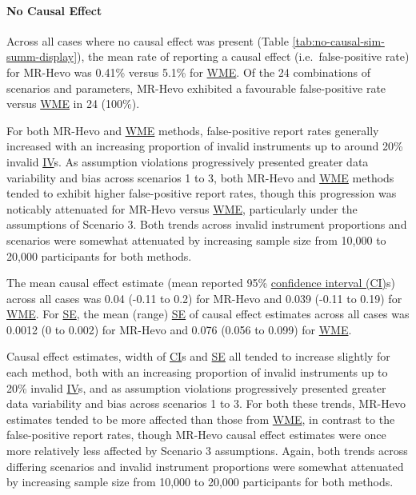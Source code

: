 \documentclass[
]{article}
\begin{document}
\paragraph{No Causal Effect}\label{no-causal-effect}

\leavevmode\newline Across all cases where no causal effect was present (Table \ref{tab:no-causal-sim-summ-display}), the mean rate of reporting a causal effect (i.e.~false-positive rate) for MR-Hevo was 0.41\% versus 5.1\% for \hyperref[acronyms_WME]{WME}. Of the 24 combinations of scenarios and parameters, MR-Hevo exhibited a favourable false-positive rate versus \hyperref[acronyms_WME]{WME} in 24 (100\%).

For both MR-Hevo and \hyperref[acronyms_WME]{WME} methods, false-positive report rates generally increased with an increasing proportion of invalid instruments up to around 20\% invalid \hyperref[acronyms_IV]{IV}s. As assumption violations progressively presented greater data variability and bias across scenarios 1 to 3, both MR-Hevo and \hyperref[acronyms_WME]{WME} methods tended to exhibit higher false-positive report rates, though this progression was noticably attenuated for MR-Hevo versus \hyperref[acronyms_WME]{WME}, particularly under the assumptions of Scenario 3. Both trends across invalid instrument proportions and scenarios were somewhat attenuated by increasing sample size from 10,000 to 20,000 participants for both methods.

The mean causal effect estimate (mean reported 95\% \hyperref[acronyms_CI]{confidence interval (CI)}s) across all cases was 0.04 (-0.11 to 0.2) for MR-Hevo and 0.039 (-0.11 to 0.19) for \hyperref[acronyms_WME]{WME}. For \hyperref[acronyms_SE]{SE}, the mean (range) \hyperref[acronyms_SE]{SE} of causal effect estimates across all cases was 0.0012 (0 to 0.002) for MR-Hevo and 0.076 (0.056 to 0.099) for \hyperref[acronyms_WME]{WME}.

Causal effect estimates, width of \hyperref[acronyms_CI]{CI}s and \hyperref[acronyms_SE]{SE} all tended to increase slightly for each method, both with an increasing proportion of invalid instruments up to 20\% invalid \hyperref[acronyms_IV]{IV}s, and as assumption violations progressively presented greater data variability and bias across scenarios 1 to 3. For both these trends, MR-Hevo estimates tended to be more affected than those from \hyperref[acronyms_WME]{WME}, in contrast to the false-positive report rates, though MR-Hevo causal effect estimates were once more relatively less affected by Scenario 3 assumptions. Again, both trends across differing scenarios and invalid instrument proportions were somewhat attenuated by increasing sample size from 10,000 to 20,000 participants for both methods.
\end{document}
